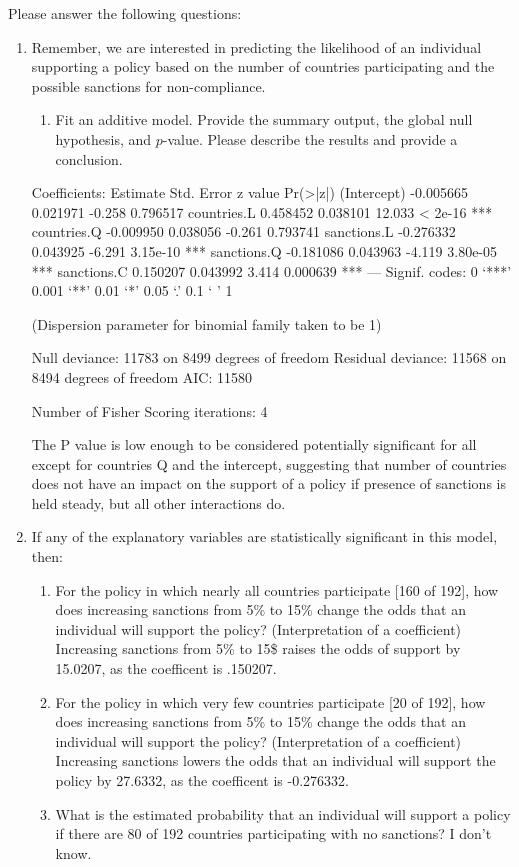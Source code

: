 \documentclass[12pt,letterpaper]{article}
\begin{document}
\newpage
\noindent Please answer the following questions:

\begin{enumerate}
	\item
	Remember, we are interested in predicting the likelihood of an individual supporting a policy based on the number of countries participating and the possible sanctions for non-compliance.
	\begin{enumerate}
		\item [] Fit an additive model. Provide the summary output, the global null hypothesis, and $p$-value. Please describe the results and provide a conclusion.
		


	\end{enumerate}
		
	
	Coefficients:
						Estimate 	Std. Error 		z value 	Pr(>|z|)    
	(Intercept) -0.005665   0.021971  -0.258 0.796517    
	countries.L  0.458452   0.038101  12.033  < 2e-16 ***
	countries.Q -0.009950   0.038056  -0.261 0.793741    
	sanctions.L -0.276332   0.043925  -6.291 3.15e-10 ***
	sanctions.Q -0.181086   0.043963  -4.119 3.80e-05 ***
	sanctions.C  0.150207   0.043992   3.414 0.000639 ***
	---
	Signif. codes:  0 ‘***’ 0.001 ‘**’ 0.01 ‘*’ 0.05 ‘.’ 0.1 ‘ ’ 1
	
	(Dispersion parameter for binomial family taken to be 1)
	
	Null deviance: 11783  on 8499  degrees of freedom
	Residual deviance: 11568  on 8494  degrees of freedom
	AIC: 11580
	
	Number of Fisher Scoring iterations: 4
	
	The P value is low enough to be considered potentially significant for all except for countries Q and the intercept, suggesting that number of countries   does not have an impact on the support of a policy if presence of sanctions is held steady, but all other interactions do.
	
	
	\item
	If any of the explanatory variables are statistically significant in this model, then:
	\begin{enumerate}
		\item
		For the policy in which nearly all countries participate [160 of 192], how does increasing sanctions from 5\% to 15\% change the odds that an individual will support the policy? (Interpretation of a coefficient)
		Increasing sanctions from 5\% to 15\$ raises the odds of support by 15.0207, as the coefficent is .150207.
		\item
		For the policy in which very few countries participate [20 of 192], how does increasing sanctions from 5\% to 15\% change the odds that an individual will support the policy? (Interpretation of a coefficient)
		Increasing sanctions lowers the odds that an individual will support the policy by 27.6332, as the coefficent is -0.276332.
		\item
		What is the estimated probability that an individual will support a policy if there are 80 of 192 countries participating with no sanctions? 
		I don't know.
		

\end{enumerate}
\end{enumerate}
\end{document}
